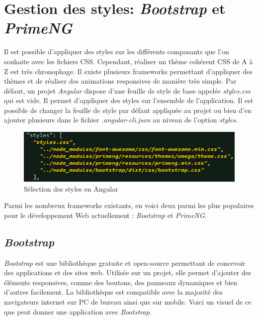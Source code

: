 \documentclass{polytech/polytech}
\begin{document}
\section{Gestion des styles: \textit{Bootstrap} et \textit{PrimeNG}}

Il est possible d’appliquer des styles sur les différents composants que l’on souhaite avec les fichiers CSS. Cependant, réaliser un thème cohérent CSS de A à Z est très chronophage. Il existe plusieurs frameworks permettant d’appliquer des thèmes et de réaliser des animations responsives de manière très simple. Par défaut, un projet \textit{Angular} dispose d’une feuille de style de base appelée \textit{styles.css} qui est vide. Il permet d’appliquer des styles sur l’ensemble de l’application. Il est possible de changer la feuille de style par défaut appliquée au projet ou bien d’en ajouter plusieurs dans le fichier \textit{.angular-cli.json} au niveau de l’option \textit{styles}.

\begin{figure}
	\includegraphics[scale=0.85]{images/styles_angular-cli}
	\caption{Sélection des styles en Angular}
	\label{fig:stylesAngular}
\end{figure}

Parmi les nombreux frameworks existants, en voici deux parmi les plus populaires pour le développement Web actuellement : \textit{Bootstrap} et \textit{PrimeNG}.

\subsection{\textit{Bootstrap}}

\textit{Bootstrap} est une bibliothèque gratuite et open-source permettant de concevoir des applications et des sites web. Utilisée sur un projet, elle permet d’ajouter des éléments responsives, comme des boutons, des panneaux dynamiques et bien d’autres facilement. La bibliothèque est compatible avec la majorité des navigateurs internet sur PC de bureau ainsi que sur mobile. Voici un visuel de ce que peut donner une application avec \textit{Bootstrap}. 
\end{document}
